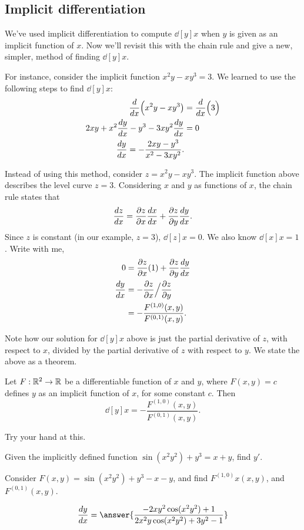 \documentclass{ximera}
\begin{document}
\subsection{Implicit differentiation}

We've used implicit differentiation to compute $\dd[y]{x}$ when $y$ is
given as an implicit function of $x$. Now we'll revisit this with the
chain rule and give a new, simpler, method of finding $\dd[y]{x}$.

For instance, consider the implicit function $x^2y-xy^3=3$. We learned
to use the following steps to find $\dd[y]{x}$:
\begin{align*}
\ddx\Big(x^2y-xy^3\big) &= \ddx\Big(3\Big) \\
2xy + x^2\dd[y]{x}-y^3-3xy^2\dd[y]{x} &= 0\\
\dd[y]{x} = -\frac{2xy-y^3}{x^2-3xy^2}.
\end{align*}
     
Instead of using this method, consider $z=x^2y-xy^3$. The implicit
function above describes the level curve $z=3$. Considering $x$ and
$y$ as functions of $x$, the chain rule states that
\[
\dd[z]{x} = \pp[z]{x}\dd[x]{x}+\pp[z]{y}\dd[y]{x}.
\]
Since $z$ is constant (in our example, $z=3$), $\dd[z]{x} = 0$. We
also know $\dd[x]{x} = 1$. Write with me,
\begin{align*}
  0 &= \pp[z]{x}(1) + \pp[z]{y}\dd[y]{x} \\
  \dd[y]{x} &= -\pp[z]{x}\Big/\pp[z]{y}\\
  &= -\frac{F^{(1,0)}(x,y)}{F^{(0,1)}(x,y)}.
\end{align*}

Note how our solution for $\dd[y]{x}$ above is just the partial
derivative of $z$, with respect to $x$, divided by the partial
derivative of $z$ with respect to $y$.  We state the above as a
theorem.

\begin{theorem}
  Let $F:\R^2\to\R$ be a differentiable function of $x$ and $y$, where
  $F(x,y)=c$ defines $y$ as an implicit function of $x$, for some
  constant $c$. Then 
  \[
  \dd[y]{x} = -\frac{F^{(1,0)}(x,y)}{F^{(0,1)}(x,y)}.
  \]
\end{theorem}

Try your hand at this.

\begin{question}
  Given the implicitly defined function $\sin(x^2y^2)+y^3=x+y$, find
  $y'$.
  \begin{hint}
    Consider $F(x,y) = \sin(x^2y^2)+y^3-x-y$, and find
    $F^{(1,0)}x(x,y)$, and $F^{(0,1)}(x,y)$.
  \end{hint}
  \begin{prompt}
  \[
  \dd[y]{x} = \answer{\frac{-2xy^2\cos(x^2y^2)+1}{2x^2y\cos(x^2y^2)+3y^2-1}}
  \]
  \end{prompt}
\end{question}

\end{document}
